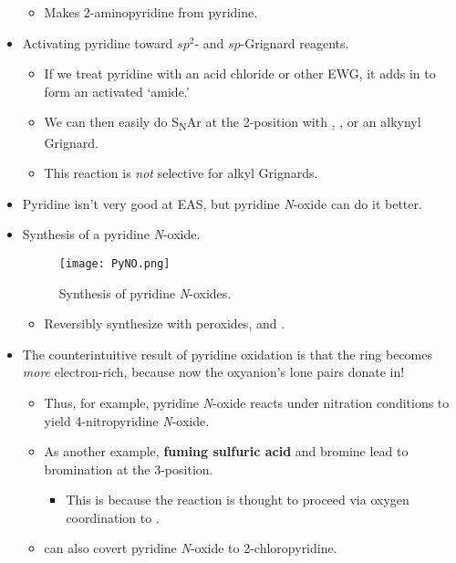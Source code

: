 \documentclass[../notes.tex]{subfiles}
\begin{document}
\begin{itemize}
\begin{figure}[h!]
        \label{fig:chichibabin}
    \end{figure}
    \begin{itemize}
        \item Makes 2-aminopyridine from pyridine.
    \end{itemize}
    \pagebreak
    \item Activating pyridine toward $sp^2$- and $sp$-Grignard reagents.
    \begin{itemize}
        \item If we treat pyridine with an acid chloride or other EWG, it adds in to form an activated `amide.'
        \item We can then easily do S\textsubscript{N}Ar at the 2-position with , , or an alkynyl Grignard.
        \item This reaction is \emph{not} selective for alkyl Grignards.
    \end{itemize}
    \item Pyridine isn't very good at EAS, but pyridine \emph{N}-oxide can do it better.
    \item Synthesis of a pyridine \emph{N}-oxide.
    \begin{figure}[h!]
        \centering
        \texttt{[image: PyNO.png]}
        \caption{Synthesis of pyridine \emph{N}-oxides.}
        \label{fig:PyNO}
    \end{figure}
    \begin{itemize}
        \item Reversibly synthesize with peroxides, and .
    \end{itemize}
    \item The counterintuitive result of pyridine oxidation is that the ring becomes \emph{more} electron-rich, because now the oxyanion's lone pairs donate in!
    \begin{itemize}
        \item Thus, for example, pyridine \emph{N}-oxide reacts under nitration conditions to yield 4-nitropyridine \emph{N}-oxide.
        \item As another example, \textbf{fuming sulfuric acid} and bromine lead to bromination at the 3-position.
        \begin{itemize}
            \item This is because the reaction is thought to proceed via oxygen coordination to .
        \end{itemize}
        \item {} can also covert pyridine \emph{N}-oxide to 2-chloropyridine.

\end{itemize}
\end{itemize}
\end{document}
